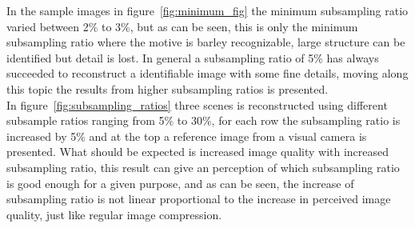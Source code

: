 In the sample images in figure~\ref{fig:minimum_fig} the minimum subsampling ratio varied between 2\% to 3\%, but as can be seen, this is only the minimum subsampling ratio where the motive is barley recognizable, large structure can be identified but detail is lost. In general a subsampling ratio of 5\% has always succeeded to reconstruct a identifiable image with some fine details, moving along this topic the results from higher subsampling ratios is presented.\\[0.1in]

In figure~\ref{fig:subsampling_ratios} three scenes is reconstructed using different subsample ratios ranging from 5\% to 30\%, for each row the subsampling ratio is increased by 5\% and at the top a reference image from a visual camera is presented. What should be expected is increased image quality with increased subsampling ratio, this result can give an perception of which subsampling ratio is good enough for a given purpose, and as can be seen, the increase of subsampling ratio is not linear proportional to the increase in perceived image quality, just like regular image compression.
     

